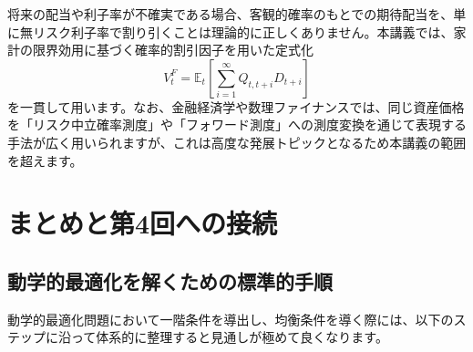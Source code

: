 \documentclass[
  japanese,
  lualatex,
  ja=standard,
  12pt,
  a4paper]{ltjsarticle}
\begin{document}
\begin{tcolorbox}[enhanced jigsaw, arc=.35mm, bottomrule=.15mm, bottomtitle=1mm, breakable, colback=white, colbacktitle=quarto-callout-note-color!10!white, colframe=quarto-callout-note-color-frame, coltitle=black, left=2mm, leftrule=.75mm, opacityback=0, opacitybacktitle=0.6, rightrule=.15mm, title=\textcolor{quarto-callout-note-color}{\faInfo}\hspace{0.5em}{リスクが存在する場合の割り引き}, titlerule=0mm, toprule=.15mm, toptitle=1mm]

将来の配当や利子率が不確実である場合、客観的確率のもとでの期待配当を、単に無リスク利子率で割り引くことは理論的に正しくありません。本講義では、家計の限界効用に基づく確率的割引因子を用いた定式化
\[
V_t^F = \mathbb{E}_t \left[ \sum_{i=1}^{\infty} Q_{t,t+i} D_{t+i} \right]
\]
を一貫して用います。なお、金融経済学や数理ファイナンスでは、同じ資産価格を「リスク中立確率測度」や「フォワード測度」への測度変換を通じて表現する手法が広く用いられますが、これは高度な発展トピックとなるため本講義の範囲を超えます。

\end{tcolorbox}

\section{まとめと第4回への接続}\label{sec-lecture03-bridge}

\subsection{動学的最適化を解くための標準的手順}\label{ux52d5ux5b66ux7684ux6700ux9069ux5316ux3092ux89e3ux304fux305fux3081ux306eux6a19ux6e96ux7684ux624bux9806}

動学的最適化問題において一階条件を導出し、均衡条件を導く際には、以下のステップに沿って体系的に整理すると見通しが極めて良くなります。
\end{document}
